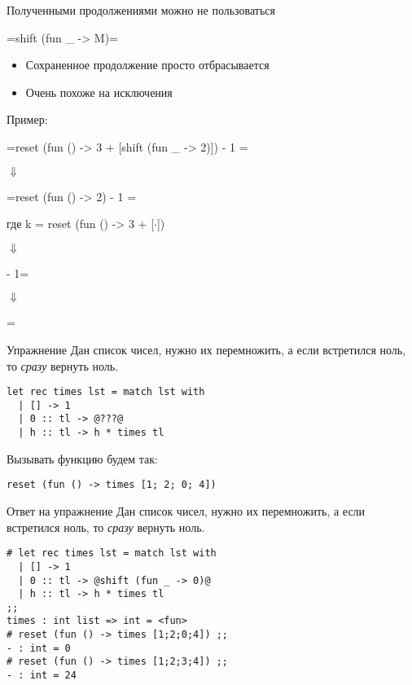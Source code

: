 \documentclass{beamer}
\begin{document}
\begin{frame}[fragile]{Полученными продолжениями можно не пользоваться}
\begin{alertblock}{ }
\camline=shift (fun _ -> M)=
\end{alertblock}
\begin{itemize}
 \item Сохраненное продолжение просто отбрасывается
 \item Очень похоже на исключения
\end{itemize}

Пример: 

\begin{center}
\camline=reset (fun () -> 3 + [shift (fun _ -> 2)]) - 1 =

{\Large $\Downarrow$}

\camline=reset (fun () ->                       2) - 1 =

где k = reset (fun () -> 3 + [$\cdot$])

{\Large $\Downarrow$}

 - 1=

{\Large $\Downarrow$}

=
\end{center}
\end{frame}

\begin{frame}[fragile]{Упражнение}
Дан список чисел, нужно их перемножить, а если встретился ноль, то \textit{сразу} вернуть ноль.
\begin{lstlisting}[style={camlstyle1}]
let rec times lst = match lst with
  | [] -> 1
  | 0 :: tl -> @???@
  | h :: tl -> h * times tl
\end{lstlisting}
Вызывать функцию будем так:
\begin{lstlisting}[style={camlstyle1}]
reset (fun () -> times [1; 2; 0; 4])
\end{lstlisting}
\end{frame}

\begin{frame}[fragile]{Ответ на упражнение}
Дан список чисел, нужно их перемножить, а если встретился ноль, то \textit{сразу} вернуть ноль.
\begin{lstlisting}[style={camlstyle1}]
# let rec times lst = match lst with
  | [] -> 1
  | 0 :: tl -> @shift (fun _ -> 0)@
  | h :: tl -> h * times tl
;;
times : int list => int = <fun>
# reset (fun () -> times [1;2;0;4]) ;;
- : int = 0
# reset (fun () -> times [1;2;3;4]) ;;
- : int = 24
\end{lstlisting}
\end{frame}
\end{document}
